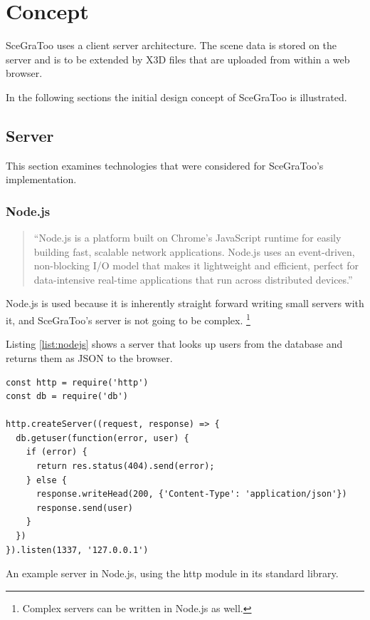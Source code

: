 
\section{Concept}
\label{concept}


\gls{SceGraToo} uses a client server architecture. The scene data is stored on the server
and is to be extended by \gls{X3D} files that are uploaded from within a web browser.

In the following sections the initial design concept of \gls{SceGraToo} is illustrated.

\subsection{Server}
\label{server}

This section examines technologies that were considered for \gls{SceGraToo}'s implementation.

\subsubsection{Node.js}
\begin{quote}
  ``Node.js is a platform built on Chrome's JavaScript runtime for easily building fast, scalable network applications. Node.js uses an event-driven, non-blocking I/O model that makes it lightweight and efficient, perfect for data-intensive real-time applications that run across distributed devices.'' \cite{nodejs}
\end{quote}

Node.js is used because it is inherently straight forward writing small servers with it, and
SceGraToo's server is not going to be complex. \footnote{Complex servers can be
written in Node.js as well.}

Listing \ref{list:nodejs} shows a server that looks up users from the database and returns them as \gls{JSON} to the browser.

\begin{listing}
  \begin{verbatim}
const http = require('http')
const db = require('db')

http.createServer((request, response) => {
  db.getuser(function(error, user) {
    if (error) {
      return res.status(404).send(error);
    } else {
      response.writeHead(200, {'Content-Type': 'application/json'})
      response.send(user)
    }
  })
}).listen(1337, '127.0.0.1')
  \end{verbatim}
  \caption{An example server in Node.js, using the http module in its standard library.}
  \label{list:nodejs}
\end{listing}

